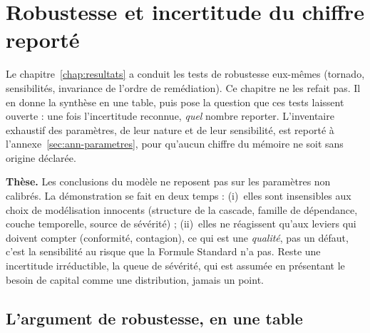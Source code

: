 \chapter{Robustesse et incertitude du chiffre reporté}
\label{ch:robustesse}

\noindent Le chapitre~\ref{chap:resultats} a conduit les tests de robustesse eux-mêmes
(tornado, sensibilités, invariance de l'ordre de remédiation). Ce chapitre ne les refait pas.
Il en donne la synthèse en une table, puis pose la question que ces tests laissent ouverte :
une fois l'incertitude reconnue, \emph{quel} nombre reporter. L'inventaire exhaustif des
paramètres, de leur nature et de leur sensibilité, est reporté à
l'annexe~\ref{sec:ann-parametres}, pour qu'aucun chiffre du mémoire ne soit sans origine
déclarée.

\begin{cle}
\textbf{Thèse.} Les conclusions du modèle ne reposent pas sur les paramètres non calibrés.
La démonstration se fait en deux temps : (i)~elles sont insensibles aux choix de modélisation
innocents (structure de la cascade, famille de dépendance, couche temporelle, source de
sévérité) ; (ii)~elles ne réagissent qu'aux leviers qui doivent compter (conformité,
contagion), ce qui est une \emph{qualité}, pas un défaut, c'est la sensibilité au risque que
la Formule Standard n'a pas. Reste une incertitude irréductible, la queue de sévérité, qui est
assumée en présentant le besoin de capital comme une distribution, jamais un point.
\end{cle}

\section{L'argument de robustesse, en une table}

